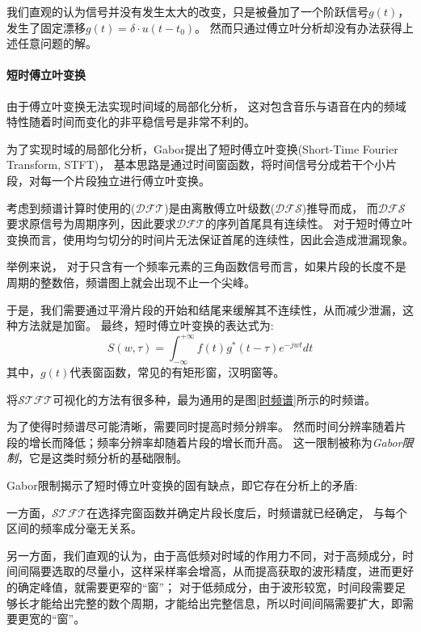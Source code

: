 \documentclass{morningstar}
\begin{document}
我们直观的认为信号并没有发生太大的改变，只是被叠加了一个阶跃信号$g(t)$，发生了固定漂移$g(t) = \delta \cdot u(t-t_0)$。
然而只通过傅立叶分析却没有办法获得上述任意问题的解。


\paragraph{短时傅立叶变换}
由于傅立叶变换无法实现时间域的局部化分析，
这对包含音乐与语音在内的频域特性随着时间而变化的非平稳信号是非常不利的。\cite{wavelet6}

为了实现时域的局部化分析，Gabor提出了短时傅立叶变换(Short-Time Fourier Transform, STFT)，
基本思路是通过时间窗函数，将时间信号分成若干个小片段，对每一个片段独立进行傅立叶变换。

考虑到频谱计算时使用的($\mathcal{DFT}$)是由离散傅立叶级数($\mathcal{DFS}$)推导而成，
而$\mathcal{DFS}$要求原信号为周期序列，因此要求$\mathcal{DFT}$的序列首尾具有连续性。
对于短时傅立叶变换而言，使用均匀切分的时间片无法保证首尾的连续性，因此会造成泄漏现象。\cite{wavelet2}

举例来说，
对于只含有一个频率元素的三角函数信号而言，如果片段的长度不是周期的整数倍，频谱图上就会出现不止一个尖峰。

于是，我们需要通过平滑片段的开始和结尾来缓解其不连续性，从而减少泄漏，这种方法就是加窗。
最终，短时傅立叶变换的表达式为: 
\begin{equation}
    S(w, \tau)=\int_{-\infty}^{+\infty} f(t) g^{*}(t-\tau) e^{-j w t} d t
\end{equation}
其中，$g(t)$代表窗函数，常见的有矩形窗，汉明窗等。

将$\mathcal{STFT}$可视化的方法有很多种，最为通用的是图\ref{时频谱}所示的时频谱。

为了使得时频谱尽可能清晰，需要同时提高时频分辨率。
然而时间分辨率随着片段的增长而降低；频率分辨率却随着片段的增长而升高。
这一限制被称为\emph{Gabor限制}，它是这类时频分析的基础限制。\cite{wavelet1}

Gabor限制揭示了短时傅立叶变换的固有缺点，即它存在分析上的矛盾:

一方面，$\mathcal{STFT}$在选择完窗函数并确定片段长度后，时频谱就已经确定，
与每个区间的频率成分毫无关系。

另一方面，我们直观的认为，由于高低频对时域的作用力不同，对于高频成分，时间间隔要选取的尽量小，这样采样率会增高，从而提高获取的波形精度，进而更好的确定峰值，就需要更窄的“窗”；
对于低频成分，由于波形较宽，时间段需要足够长才能给出完整的数个周期，才能给出完整信息，所以时间间隔需要扩大，即需要更宽的“窗”。
\end{document}
